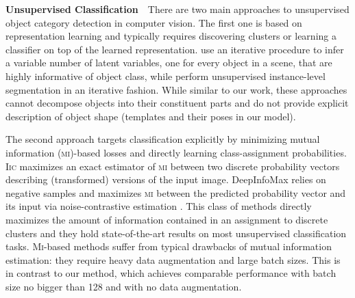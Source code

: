 
\textbf{Unsupervised Classification}\ \ 
There are two main approaches to unsupervised object category detection in computer vision.
The first one is based on representation learning and typically requires discovering clusters or learning a classifier on top of the learned representation.
\cite{Eslami2016,Kosiorek2018sqair} use an iterative procedure to infer a variable number of latent variables, one for every object in a scene, that are highly informative of object class, while \cite{Greff2019multi,Burgess2019monet} perform unsupervised instance-level segmentation in an iterative fashion.
While similar to our work, these approaches cannot decompose objects into their constituent parts and do not provide explicit description of object shape (\!\eg templates and their poses in our model).

The second approach targets classification explicitly by minimizing mutual information (\textsc{mi})-based losses and directly learning class-assignment probabilities.
\textsc{Iic} \citep{iic} maximizes an exact estimator of \textsc{mi} between two discrete probability vectors describing (transformed) versions of the input image.
DeepInfoMax \citep{Hjelm2019deepinfomax} relies on negative samples and maximizes \textsc{mi} between the predicted probability vector and its input via noise-contrastive estimation \citep{Gutmann2010nce}.
This class of methods directly maximizes the amount of information contained in an assignment to discrete clusters and they hold state-of-the-art results on most unsupervised classification tasks.
\textsc{Mi}-based methods suffer from typical drawbacks of mutual information estimation: they require heavy data augmentation and large batch sizes.
This is in contrast to our method, which achieves comparable performance with batch size no bigger than 128 and with no data augmentation.

